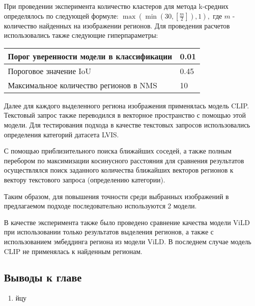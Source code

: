 \documentclass[a4paper,14pt]{article}
\begin{document}
    При проведении эксперимента количество кластеров для метода k-средних определялось по следующей формуле: $\max(\min(30, \left[\frac{m}{2}\right]), 1),$ где $m$ - количество найденных на изображении регионов. Для проведения расчетов использовались также следующие гиперпараметры:
    \begin{center}
    	\begin{tabular}{| l | l |}
    		\hline
    		Порог уверенности модели в классификации & 0.01\\ \hline
    		Пороговое значение IoU & 0.45 \\ \hline
    		Максимальное количество регионов в NMS  & 10\\
    		\hline
    	\end{tabular}
    \end{center}

	Далее для каждого выделенного региона изображения применялась модель CLIP. Текстовый запрос также переводился в векторное пространство с помощью этой модели. Для тестирования подхода в качестве текстовых запросов использовались определения категорий датасета LVIS.
	
	С помощью приблизительного поиска ближайших соседей, а также полным перебором по максимизации косинусного расстояния для сравнения результатов осуществлялся поиск заданного количества ближайших векторов регионов к вектору текстового запроса (определению категории).
	
    
    Таким образом, для повышения точности среди выбранных изображений в предлагаемом подходе последовательно используются 2 модели.
    
    В качестве эксперимента также было проведено сравнение качества модели ViLD при использовании только результатов выделения регионов, а также с использованием эмбеддинга региона из модели ViLD. В последнем случае модель CLIP не применялась к найденным регионам.
    
    \subsection{Выводы к главе \thesection}
    \begin{enumerate}
        [1)]
        \itemsep0em
        \item йцу
    \end{enumerate}

    \newpage
\end{document}

